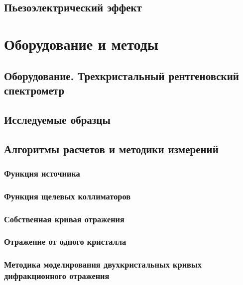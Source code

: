 \documentclass[pdftex,a4paper,14pt,english,russian]{extarticle}
\numberwithin{equation}{subsection}
\newcounter{subsubsubsection}[subsubsection]
\begin{document}
  \subsection{Пьезоэлектрический эффект}
    

\newpage
\section{Оборудование и методы}
  \subsection{Оборудование. Трехкристальный рентгеновский спектрометр}
    
  \subsection{Исследуемые образцы}
      
  \subsection{Алгоритмы расчетов и методики измерений}
    
    \subsubsection{Функция источника}
      
    \subsubsection{Функция щелевых коллиматоров}
      
    \subsubsection{Собственная кривая отражения}
      
    \subsubsection{Отражение от одного кристалла}
      
    \subsubsection{Методика моделирования двухкристальных кривых дифракционного отражения}
      
      
\end{document}
